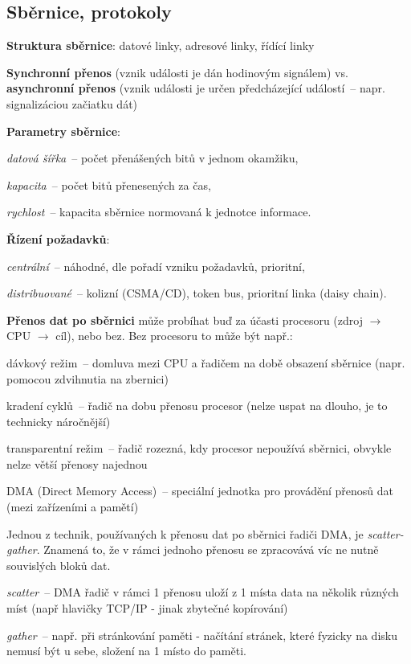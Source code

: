 \subsection{Sběrnice, protokoly}

\begin{pitemize}
	\item \textbf{Struktura sběrnice}: datové linky, adresové linky, řídící linky
	\item \textbf{Synchronní přenos} (vznik události je dán hodinovým signálem) vs. \textbf{asynchronní přenos} (vznik události je určen předcházející událostí~-- napr. signalizáciou začiatku dát) 
	\item \textbf{Parametry sběrnice}: 
	\begin{pitemize}
	  \item \emph{datová šířka}~-- počet přenášených bitů v jednom okamžiku,
	  \item \emph{kapacita}~-- počet bitů přenesených za čas,
	  \item \emph{rychlost}~-- kapacita sběrnice normovaná k jednotce informace. 
	\end{pitemize}  
	\item \textbf{Řízení požadavků}: 
	\begin{pitemize}
	  \item \emph{centrální}~-- náhodné, dle pořadí vzniku požadavků, prioritní,
	  \item \emph{distribuované}~-- kolizní (CSMA/CD), token bus, prioritní linka (daisy chain).
	\end{pitemize} 
	\item \textbf{Přenos dat po sběrnici} může probíhat buď za účasti procesoru (zdroj $\rightarrow$ CPU $\rightarrow$ cíl), nebo bez. Bez procesoru to může být např.:
	\begin{pitemize}
		\item dávkový režim~-- domluva mezi CPU a řadičem na době obsazení sběrnice (napr. pomocou zdvihnutia  na zbernici)
		\item kradení cyklů~-- řadič na dobu přenosu  procesor (nelze uspat na dlouho, je to technicky náročnější)
		\item transparentní režim~-- řadič rozezná, kdy procesor nepoužívá sběrnici, obvykle nelze větší přenosy najednou
		\item DMA (Direct Memory Access)~-- speciální jednotka pro provádění přenosů dat (mezi zařízeními a pamětí)
	\end{pitemize}
	Jednou z technik, používaných k přenosu dat po sběrnici řadiči DMA, je \emph{scatter-gather}. Znamená to, že v rámci jednoho přenosu se zpracovává víc ne nutně souvislých bloků dat. 
	\begin{pitemize}
	    \item \emph{scatter}~-- DMA řadič v rámci 1 přenosu uloží z 1 místa data na několik různých míst (např hlavičky TCP/IP - jinak zbytečné kopírování)  
	    \item \emph{gather}~-- např. při stránkování paměti - načítání stránek, které fyzicky na disku nemusí být u sebe, složení na 1 místo do paměti.
	\end{pitemize}
\end{pitemize}


